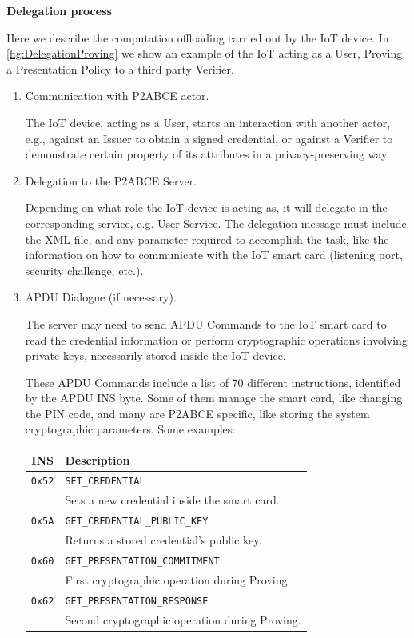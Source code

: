 \hfil

\begin{flushleft}
	\textbf{Delegation process}
\end{flushleft}

Here we describe the computation offloading carried out by the IoT device.  In \autoref{fig:DelegationProving} we show an example of the IoT acting as a User, Proving a Presentation Policy to a third party Verifier.

\begin{enumerate}
	\item Communication with P2ABCE actor.
	
	The IoT device, acting as a User, starts an interaction with another actor, e.g., against an Issuer to obtain a signed credential, or against a Verifier to demonstrate certain property of its attributes in a privacy-preserving way.
	
	\item Delegation to the P2ABCE Server.
	
	Depending on what role the IoT device is acting as, it will delegate in the corresponding service, e.g. User Service. The delegation message must include the XML file, and any parameter required to accomplish the task, like the information on how to communicate with the IoT smart card (listening port, security challenge, etc.).
	
	\item APDU Dialogue (if necessary).
	
	The server may need to send APDU Commands to the IoT smart card to read the credential information or perform cryptographic operations involving private keys, necessarily stored inside the IoT device.
	
	These APDU Commands include a list of 70 different instructions, identified by the APDU INS byte. Some of them manage the smart card, like changing the PIN code, and many are P2ABCE specific, like storing the system cryptographic parameters. Some examples:
	
	\begin{tabular}{|c|l|}
		\hline
		INS & Description \\
		\hline
		\texttt{0x52} & \texttt{SET\_CREDENTIAL} \\ & Sets a new credential inside the smart card.\\
		\texttt{0x5A} & \texttt{GET\_CREDENTIAL\_PUBLIC\_KEY} \\ & Returns a stored credential's public key.\\
		\texttt{0x60} & \texttt{GET\_PRESENTATION\_COMMITMENT} \\ & First cryptographic operation during Proving.\\
		\texttt{0x62} & \texttt{GET\_PRESENTATION\_RESPONSE} \\ & Second cryptographic operation during Proving.\\
		\hline		
	\end{tabular}


\end{enumerate}
